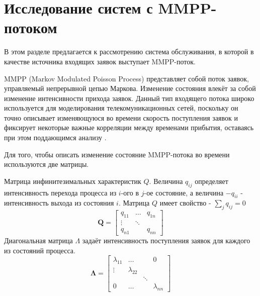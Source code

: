 \section {Исследование систем с MMPP-потоком}
В этом разделе предлагается к рассмотрению система обслуживания, в которой в качестве источника входящих заявок выступает MMPP-поток.

MMPP (Markov Modulated Poisson Process) представляет собой поток заявок, управляемый непрерывной цепью Маркова. Изменение состояния влекёт за собой изменение интенсивности прихода заявок. Данный тип входящего потока широко используется для моделирования телекомуникационных сетей, поскольку он точно описывает изменяющуюся во времени скорость поступления заявок и фиксирует некоторые важные корреляции между временами прибытия, оставаясь при этом поддающимся анализу \cite{fischer1993markov}.
 


Для того, чтобы описать изменение состояние MMPP-потока во времени используются две матрицы.

Матрица инфинитезимальных характеристик $Q$. Величина $q_{ij}$ определяет интенсивность перехода процесса из $i$-ого в $j$-ое состояние, а величина $-q_{ii}$ - интенсивность выхода из состояния $i$.
Матрица $Q$ имеет свойство - $\sum_{j}q_{ij} = 0$
\begin{equation*}
	\boldsymbol{Q}=\begin{bmatrix}
		q_{11} &  \dots &  q_{1n}\\
		\vdots & \ddots &  \\
		q_{n1} &    	&	q_{nn}
	\end{bmatrix}
\end{equation*}
Диагональная матрица $\Lambda$ задаёт интенсивность поступления заявок для каждого из состояний процесса.
\begin{equation*}
	\boldsymbol{\Lambda}=\begin{bmatrix}
		\lambda_{11}&	\dots	&   	 & 0\\
		\vdots 		&\lambda_{22}&  	 &   \\
		       		&    		& \ddots &   \\
		0  			&   \dots 	&		 & \lambda_{nn}
	\end{bmatrix}
\end{equation*}

